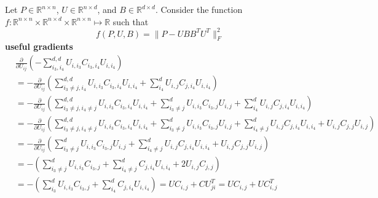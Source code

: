 \documentclass{report}
\begin{document}
   	\newpage
   	Let $ P \in \mathbb{R}^{n \times n} $, $ U \in \mathbb{R}^{n \times d} $, and $B \in \mathbb{R}^{d \times d} $. Consider the function $ f: \mathbb{R}^{n \times n} \times \mathbb{R}^{n \times d} \times \mathbb{R}^{n \times n} \mapsto \mathbb{R} $ such that 
   	\[ 
   	  f(P,U,B) = \|P - UBB^TU^T\|_F^2
   	\]
   	\textbf{useful gradients}
   	\begin{align*}
   	&\frac{\partial}{\partial U_{ij}} 
   	(- \sum_{i_3,i_4}^{d,d}U_{i,i_3}C_{i_3,i_4}U_{i,i_4}) \\
   	&=  -\frac{\partial}{\partial U_{ij}} 
   	(\sum_{i_3 \neq j,i_4}^{d,d}U_{i,i_3}C_{i_3,i_4}U_{i,i_4} 
   	+ \sum_{i_4}^{d}U_{i,j}C_{j,i_4}U_{i,i_4}) \\
   	&= -\frac{\partial}{\partial U_{ij}} (\sum_{i_3 \neq j,i_4 \neq j}^{d,d}U_{i,i_3}C_{i_3,i_4}U_{i,i_4}
   	+ \sum_{i_3 \neq j}^{d}U_{i,i_3}C_{i_3,j}U_{i,j} 
   	+ \sum_{i_4}^{d}U_{i,j}C_{j,i_4}U_{i,i_4})\\
   	&= -\frac{\partial}{\partial U_{ij}} 
   	(\sum_{i_3 \neq j,i_4 \neq j}^{d,d}U_{i,i_3}C_{i_3,i_4}U_{i,i_4} 
   	+ \sum_{i_3 \neq j}^{d}U_{i,i_3}C_{i_3,j}U_{i,j} 
   	+ \sum_{i_4 \neq j}^{d}U_{i,j}C_{j,i_4}U_{i,i_4} 
   	+ U_{i,j}C_{j,j}U_{i,j} )\\
   	&= -\frac{\partial}{\partial U_{ij}} (
   	\sum_{i_3 \neq j}^{d}U_{i,i_3}C_{i_3,j}U_{i,j} 
   	+ \sum_{i_4 \neq j}^{d}U_{i,j}C_{j,i_4}U_{i,i_4} 
   	+ U_{i,j}C_{j,j}U_{i,j} ) \\
   	&= -(
   	\sum_{i_3 \neq j}^{d}U_{i,i_3}C_{i_3,j} 
   	+ \sum_{i_4 \neq j}^{d}C_{j,i_4}U_{i,i_4} 
   	+ 2U_{i,j}C_{j,j})\\
   	&= -(
   	\sum_{i_3}^{d}U_{i,i_3}C_{i_3,j} + \sum_{i_4}^{d}C_{j,i_4}U_{i,i_4})  
   	=UC_{i,j} + CU^T_{ji} = UC_{i,j} + UC^T_{i,j}
   	\end{align*}
   	
\end{document}
